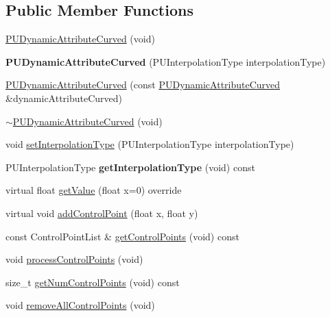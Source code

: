 \subsection*{Public Member Functions}
\begin{DoxyCompactItemize}
\item 
\hyperlink{classPUDynamicAttributeCurved_a12fc9225a908cbe9e4b0d6d18cadd7fe}{P\+U\+Dynamic\+Attribute\+Curved} (void)
\item 
\mbox{\label{classPUDynamicAttributeCurved_a42b631871bb9f97466f5eb2752972996}} 
{\bfseries P\+U\+Dynamic\+Attribute\+Curved} (P\+U\+Interpolation\+Type interpolation\+Type)
\item 
\hyperlink{classPUDynamicAttributeCurved_a784415ec7fc8db1060cd7081fb3ff330}{P\+U\+Dynamic\+Attribute\+Curved} (const \hyperlink{classPUDynamicAttributeCurved}{P\+U\+Dynamic\+Attribute\+Curved} \&dynamic\+Attribute\+Curved)
\item 
\hyperlink{classPUDynamicAttributeCurved_aab42c2e65980043836ec2ab691957684}{$\sim$\+P\+U\+Dynamic\+Attribute\+Curved} (void)
\item 
void \hyperlink{classPUDynamicAttributeCurved_a3464d6f7460c44c22484641ac7c7a759}{set\+Interpolation\+Type} (P\+U\+Interpolation\+Type interpolation\+Type)
\item 
\mbox{\label{classPUDynamicAttributeCurved_aa4e1edb3936c9025eae58b3e1356a82d}} 
P\+U\+Interpolation\+Type {\bfseries get\+Interpolation\+Type} (void) const
\item 
virtual float \hyperlink{classPUDynamicAttributeCurved_a07fad3406f2e08cee1249a2ae125caf7}{get\+Value} (float x=0) override
\item 
virtual void \hyperlink{classPUDynamicAttributeCurved_aa30f378a1110c8ef09a87d2367bf7e6d}{add\+Control\+Point} (float x, float y)
\item 
const Control\+Point\+List \& \hyperlink{classPUDynamicAttributeCurved_aae7baefe5b6a0ed619449655085c93a5}{get\+Control\+Points} (void) const
\item 
void \hyperlink{classPUDynamicAttributeCurved_a42e53d97ce7140afa04da3e09801d719}{process\+Control\+Points} (void)
\item 
size\+\_\+t \hyperlink{classPUDynamicAttributeCurved_a12faf3ab6827362c7efffe32346f7388}{get\+Num\+Control\+Points} (void) const
\item 
void \hyperlink{classPUDynamicAttributeCurved_aafd05dd4bb62d9a495f48d18cb646c1b}{remove\+All\+Control\+Points} (void)

\end{DoxyCompactItemize}

